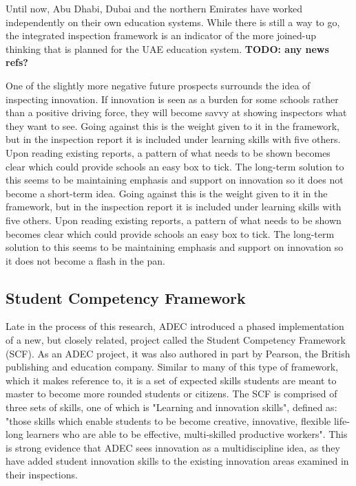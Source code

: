 Until now, Abu Dhabi, Dubai and the northern Emirates have worked independently on their own education systems. While there is still a way to go, the integrated inspection framework is an indicator of the more joined-up thinking that is planned for the UAE education system. \textbf{TODO: any news refs?}

One of the slightly more negative future prospects surrounds the idea of inspecting innovation. If innovation is seen as a burden for some schools rather than a positive driving force, they will become savvy at showing inspectors what they want to see. Going against this is the weight given to it in the framework, but in the inspection report it is included under learning skills with five others. Upon reading existing reports, a pattern of what needs to be shown becomes clear which could provide schools an easy box to tick. The long-term solution to this seems to be maintaining emphasis and support on innovation so it does not become a short-term idea. 
Going against this is the weight given to it in the framework, but in the inspection report it is included under learning skills with five others. Upon reading existing reports, a pattern of what needs to be shown becomes clear which could provide schools an easy box to tick. The long-term solution to this seems to be maintaining emphasis and support on innovation so it does not become a flash in the pan. 

\subsection{Student Competency Framework}

Late in the process of this research, ADEC introduced a phased implementation of a new, but closely related, project called the Student Competency Framework (SCF). As an ADEC project, it was also authored in part by Pearson, the British publishing and education company. Similar to many of this type of framework, which it makes reference to, it is a set of expected skills students are meant to master to become more rounded students or citizens. The SCF is comprised of three sets of skills, one of which is "Learning and innovation skills", defined as: "those skills which enable students to be become creative, innovative, flexible life-long learners who are able to be effective, multi-skilled productive workers". This is strong evidence that ADEC sees innovation as a multidiscipline idea, as they have added student innovation skills to the existing innovation areas examined in their inspections.

